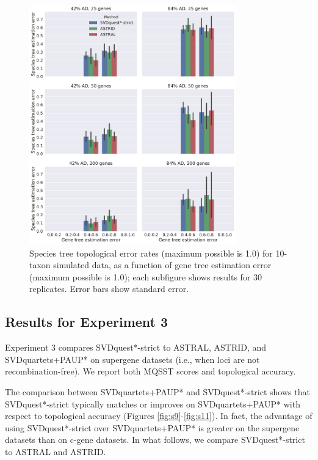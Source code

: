 \begin{figure}
  \centering
  \includegraphics[width=0.8\textwidth]{svdquest-figs/coalescent_rfdists_10tax.pdf}
\caption[Species tree topological error rates for 10-taxon simulated data]{Species tree topological error rates (maximum possible is 1.0) for 10-taxon simulated data, as a
    function of gene tree estimation error (maximum possible is 1.0); each subfigure shows results for 30 replicates. Error bars show standard
    error. 
}
    \label{svdquest::fig:exp2_10}
\end{figure}


\clearpage
\subsection{Results for Experiment 3}

Experiment 3 compares SVDquest*-strict to  ASTRAL, ASTRID, and SVDquartets+PAUP* on supergene datasets (i.e.,  when loci are not
recombination-free). 
We report both MQSST scores and topological accuracy.


The comparison between SVDquartets+PAUP* and SVDquest*-strict shows that
SVDquest*-strict typically matches or improves on SVDquartets+PAUP* with respect to
topological accuracy  {(Figures \ref{fig:s9}-\ref{fig:s11})}. 
In fact, the advantage of using SVDquest*-strict over SVDquartets+PAUP* is greater
on the supergene datasets than on c-gene datasets.
In what follows, we compare SVDquest*-strict to ASTRAL and ASTRID.



